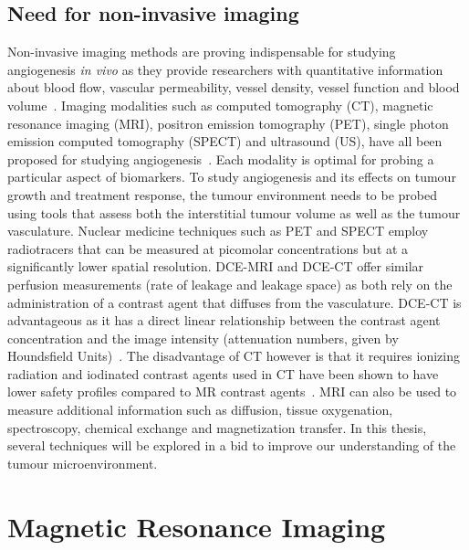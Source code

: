 \subsection{Need for non-invasive imaging}
Non-invasive imaging methods are proving indispensable for studying angiogenesis \emph{in vivo} as they provide researchers with quantitative information about blood flow, vascular permeability, vessel density, vessel function and blood volume~\cite{McDonald:2003cm}.
Imaging modalities such as computed tomography (CT), magnetic resonance imaging (MRI), positron emission tomography (PET), single photon emission computed tomography (SPECT) and ultrasound (US), have all been proposed for studying angiogenesis~\cite{Laking:2006ij}.
Each modality is optimal for probing a particular aspect of biomarkers. To study angiogenesis and its effects on tumour growth and treatment response, the tumour environment needs to be probed using tools that assess both the interstitial tumour volume as well as the tumour vasculature.
Nuclear medicine techniques such as PET and SPECT employ radiotracers that can be measured at picomolar concentrations but at a significantly lower spatial resolution.
DCE-MRI and DCE-CT offer similar perfusion measurements (rate of leakage and leakage space) as both rely on the administration of a contrast agent that diffuses from the vasculature.
DCE-CT is advantageous as it has a direct linear relationship between the contrast agent concentration and the image intensity (attenuation numbers, given by Houndsfield Units)~\cite{Cuenod:2006jy}.
The disadvantage of CT however is that it requires ionizing radiation and iodinated contrast agents used in CT have been shown to have lower safety profiles compared to MR contrast agents~\cite{Hasebroock:2009hw}.
MRI can also be used to measure additional information such as diffusion, tissue oxygenation, spectroscopy, chemical exchange and magnetization transfer. 
In this thesis, several techniques will be explored in a bid to improve our understanding of the tumour microenvironment.

\section{Magnetic Resonance Imaging}

